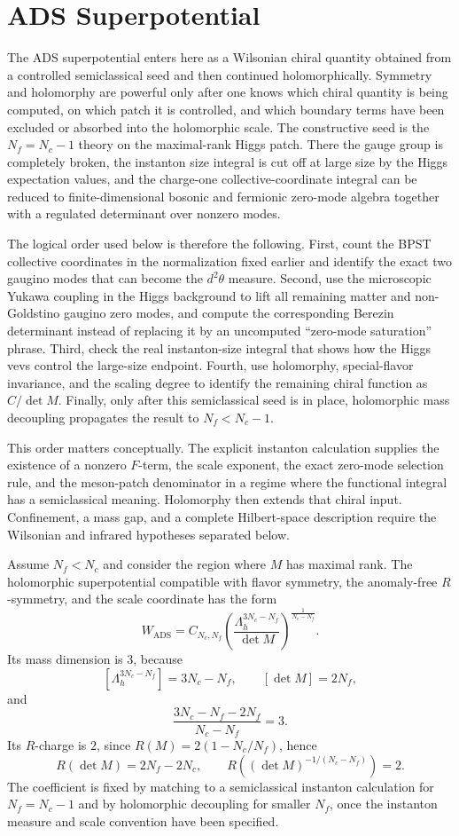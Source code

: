 \section{ADS Superpotential}

The ADS superpotential enters here as a Wilsonian chiral quantity obtained
from a controlled semiclassical seed and then continued holomorphically.
Symmetry and holomorphy are powerful only after one knows which chiral
quantity is being computed, on which patch it is controlled, and which
boundary terms have been excluded or absorbed into the holomorphic scale.
The constructive seed is the \(N_f=N_c-1\) theory on the
maximal-rank Higgs patch.  There the gauge group is completely broken, the
instanton size integral is cut off at large size by the Higgs expectation
values, and the charge-one collective-coordinate integral can be reduced to
finite-dimensional bosonic and fermionic zero-mode algebra together with a
regulated determinant over nonzero modes.

The logical order used below is therefore the following.  First, count the
BPST collective coordinates in the normalization fixed earlier and identify
the exact two gaugino modes that can become the \(d^2\theta\) measure.
Second, use the microscopic Yukawa coupling in the Higgs background to lift
all remaining matter and non-Goldstino gaugino zero modes, and compute the
corresponding Berezin determinant instead of replacing it by an uncomputed
``zero-mode saturation'' phrase.  Third, check the real instanton-size
integral that shows how the Higgs vevs control the large-size endpoint.  Fourth, use
holomorphy, special-flavor invariance, and the scaling degree to identify the
remaining chiral function as \(C/\det M\).  Finally, only after this
semiclassical seed is in place, holomorphic mass decoupling propagates the
result to \(N_f<N_c-1\).

This order matters conceptually.  The explicit instanton calculation supplies
the existence of a nonzero \(F\)-term, the scale exponent, the exact
zero-mode selection rule, and the meson-patch denominator in a regime where
the functional integral has a semiclassical meaning.  Holomorphy then extends
that chiral input.  Confinement, a mass gap, and a complete Hilbert-space
description require the Wilsonian and infrared hypotheses separated below.

Assume \(N_f<N_c\) and consider the region where \(M\) has maximal rank.  The
holomorphic superpotential compatible with flavor symmetry, the anomaly-free
\(R\)-symmetry, and the scale coordinate has the form
\[
  W_{\mathrm{ADS}}
  =
  C_{N_c,N_f}
  \left(
  \frac{\Lambda_h^{3N_c-N_f}}{\det M}
  \right)^{\frac{1}{N_c-N_f}} .
\]
Its mass dimension is \(3\), because
\[
  [\Lambda_h^{3N_c-N_f}]=3N_c-N_f,\qquad
  [\det M]=2N_f,
\]
and
\[
  \frac{3N_c-N_f-2N_f}{N_c-N_f}=3 .
\]
Its \(R\)-charge is \(2\), since \(R(M)=2(1-N_c/N_f)\), hence
\[
  R(\det M)=2N_f-2N_c,
  \qquad
  R\!\left((\det M)^{-1/(N_c-N_f)}\right)=2 .
\]
The coefficient is fixed by matching to a semiclassical instanton
calculation for \(N_f=N_c-1\) and by holomorphic decoupling for smaller
\(N_f\), once the instanton measure and scale convention have been specified.

